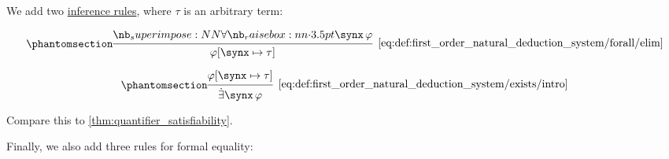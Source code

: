 \begin{definition}
\begin{thmenum}
     We add two \hyperref[def:inference_rule]{inference rules}, where \( \tau \) is an arbitrary term:

    \begin{minipage}{0.45\textwidth}
      \begin{equation*}\taglabel[\ensuremath{ \synforall_- }]{eq:def:first_order_natural_deduction_system/forall/elim}
        \begin{prooftree}
          \hypo{ \qforall \synx \varphi }
          \infer1[\ref{eq:def:first_order_natural_deduction_system/forall/elim}]{ \varphi[\synx \mapsto \tau] }
        \end{prooftree}
      \end{equation*}
    \end{minipage}
    \hfill
    \begin{minipage}{0.45\textwidth}
      \begin{equation*}\taglabel[\ensuremath{ \synexists_+ }]{eq:def:first_order_natural_deduction_system/exists/intro}
        \begin{prooftree}
          \hypo{ \varphi[\synx \mapsto \tau] }
          \infer1[\ref{eq:def:first_order_natural_deduction_system/exists/intro}]{ \qexists \synx \varphi }
        \end{prooftree}
      \end{equation*}
    \end{minipage}

    Compare this to \cref{thm:quantifier_satisfiability}.

     Finally, we also add three rules for formal equality:


\end{thmenum}
\end{definition}
